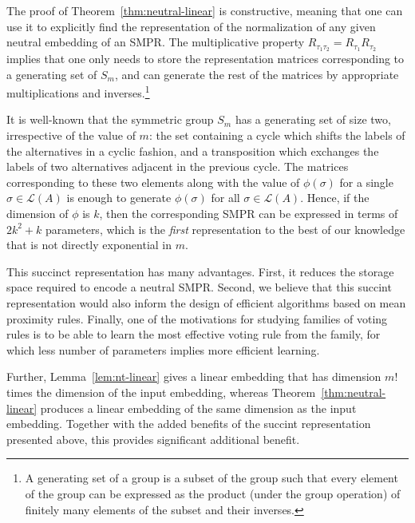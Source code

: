 \documentclass[prodmode,acmec]{ec-acmsmall}
\newcommand{\calL}{{\mathcal{L}}}
\newcommand{\rank}{{\calL(A)}}
\begin{document}
The proof of Theorem~\ref{thm:neutral-linear} is constructive, meaning that one can use it to explicitly find the representation of the normalization of any given neutral embedding of an SMPR. The multiplicative property $R_{\tau_1 \tau_2} = R_{\tau_1} R_{\tau_2}$ implies that one only needs to store the representation matrices corresponding to a generating set of $S_m$, and can generate the rest of the matrices by appropriate multiplications and inverses.\footnote{A generating set of a group is a subset of the group such that every element of the group can be expressed as the product (under the group operation) of finitely many elements of the subset and their inverses.} 

It is well-known that the symmetric group $S_m$ has a generating set of size two, irrespective of the value of $m$: the set containing a cycle which shifts the labels of the alternatives in a cyclic fashion, and a transposition which exchanges the labels of two alternatives adjacent in the previous cycle. The matrices corresponding to these two elements along with the value of $\phi(\sigma)$ for a single $\sigma \in \rank$ is enough to generate $\phi(\sigma)$ for all $\sigma \in \rank$. Hence, if the dimension of $\phi$ is $k$, then the corresponding SMPR can be expressed in terms of $2 k^2 + k$ parameters, which is the \emph{first} representation to the best of our knowledge that is not directly exponential in $m$. %

This succinct representation has many advantages. First, it reduces the storage space required to encode a neutral SMPR. Second, we believe that this succint representation would also inform the design of efficient algorithms based on mean proximity rules. Finally, one of the motivations for studying families of voting rules is to be able to learn the most effective voting rule from the family, for which less number of parameters implies more efficient learning. 

Further, Lemma~\ref{lem:nt-linear} gives a linear embedding that has dimension $m!$ times the dimension of the input embedding, whereas Theorem~\ref{thm:neutral-linear} produces a linear embedding of the same dimension as the input embedding. Together with the added benefits of the succint representation presented above, this provides significant additional benefit. 
\end{document}
